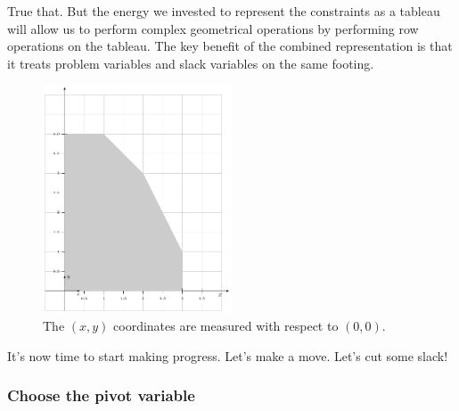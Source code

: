 \documentclass[11pt,oneside]{article}
\begin{document}
		True that. 
		But the energy we invested to represent the constraints as a tableau 
		will allow us to perform complex geometrical operations by performing row operations on the tableau.
		The key benefit of the combined representation is that it treats 
		problem variables and slack variables on the same footing.
		
		\begin{figure}[htb]
		\begin{center}
		\includegraphics[width=0.5\textwidth]{figures/linear_algebra/linear_programming_1.pdf}
		\end{center}
		\vspace{-6mm}
		\caption{The $(x,y)$ coordinates are measured with respect to $(0,0)$.}
		\label{fig:linear_programming_1}
		\end{figure}


		
		It's now time to start making progress. 
		Let's make a move. Let's cut some slack!

		
		
	\subsubsection{Choose the pivot variable}
\end{document}
